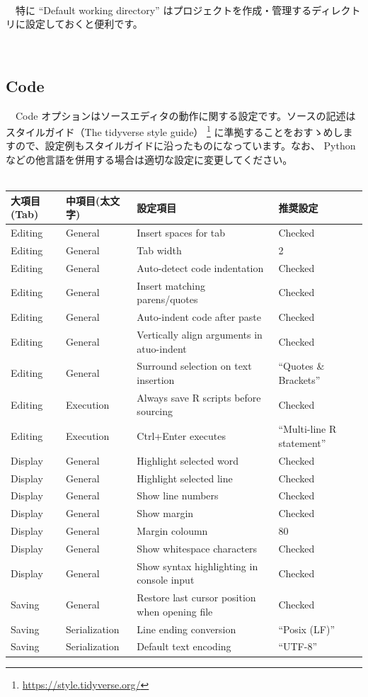\documentclass[
  12pt,
]{book}
\DeclareRobustCommand{\href}[2]{#2\footnote{\url{#1}}}
\begin{document}
　\\
　特に ``Default working directory'' はプロジェクトを作成・管理するディレクトリに設定しておくと便利です。

　

\hypertarget{code}{%
\subsection{Code}\label{code}}

　Code オプションはソースエディタの動作に関する設定です。ソースの記述は \href{https://style.tidyverse.org/}{スタイルガイド（The tidyverse style guide） } に準拠することをおすゝめしますので、設定例もスタイルガイドに沿ったものになっています。なお、 Python などの他言語を併用する場合は適切な設定に変更してください。\\
　

\begin{longtable}[]{@{}llll@{}}
\toprule
大項目(Tab) & 中項目(太文字) & 設定項目 & 推奨設定 \\
\midrule
\endhead
Editing & General & Insert spaces for tab & Checked \\
Editing & General & Tab width & 2 \\
Editing & General & Auto-detect code indentation & Checked \\
Editing & General & Insert matching parens/quotes & Checked \\
Editing & General & Auto-indent code after paste & Checked \\
Editing & General & Vertically align arguments in atuo-indent & Checked \\
Editing & General & Surround selection on text insertion & ``Quotes \& Brackets'' \\
Editing & Execution & Always save R scripts before sourcing & Checked \\
Editing & Execution & Ctrl+Enter executes & ``Multi-line R statement'' \\
Display & General & Highlight selected word & Checked \\
Display & General & Highlight selected line & Checked \\
Display & General & Show line numbers & Checked \\
Display & General & Show margin & Checked \\
Display & General & Margin coloumn & 80 \\
Display & General & Show whitespace characters & Checked \\
Display & General & Show syntax highlighting in console input & Checked \\
Saving & General & Restore last cursor position when opening file & Checked \\
Saving & Serialization & Line ending conversion & ``Posix (LF)'' \\
Saving & Serialization & Default text encoding & ``UTF-8'' \\
\bottomrule
\end{longtable}
\end{document}
